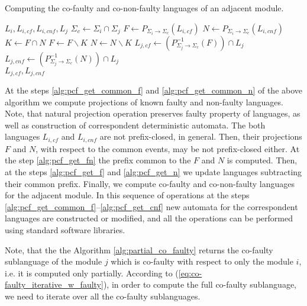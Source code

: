 \documentclass[a4paper, 10pt, conference]{ieeeconf}
\begin{document}
\begin{algorithm} Computing the co-faulty and co-non-faulty languages of an
adjacent module.
\label{alg:partial_co_faulty}
\begin{algorithmic}[1]
	\Require $L_i, L_{i,cf}, L_{i,cnf}, L_j$
	\State $\Sigma_c \leftarrow \Sigma_i \cap \Sigma_j$ 
		\label{alg:pcf_get_common}
	\State $F \leftarrow P_{\Sigma_i \rightarrow \Sigma_c}(L_{i,cf})$
		\label{alg:pcf_get_common_f}
	\State $N \leftarrow P_{\Sigma_i \rightarrow \Sigma_c}(L_{i,cnf})$
		\label{alg:pcf_get_common_n}
	\State $K \leftarrow F \cap N$
		\label{alg:pcf_get_fn}
	\State $F \leftarrow F\backslash K$
		\label{alg:pcf_get_f}
	\State $N \leftarrow N\backslash K$
		\label{alg:pcf_get_n}
	\State $L_{j,cf} \leftarrow 
		(P_{\Sigma_j \rightarrow \Sigma_c}^{-1}(F)) \cap L_j$
		\label{alg:pcf_get_cf}
	\State $L_{j,cnf} \leftarrow 
		(P_{\Sigma_j \rightarrow \Sigma_c}^{-1}(N)) \cap L_j$
		\label{alg:pcf_get_cnf}
	\\
	\Return $L_{j,cf}, L_{j,cnf}$
\end{algorithmic}
\end{algorithm}

At the steps \ref{alg:pcf_get_common_f} and \ref{alg:pcf_get_common_n} of the
above algorithm we compute projections of known faulty and non-faulty languages.
Note, that natural projection operation preserves faulty property of languages,
as well as construction of correspondent deterministic automata. The both
languages $L_{i,cf}$ and $L_{i,cnf}$ are not prefix-closed, in general. Then,
their projections $F$ and $N$, with respect to the common events, may be not
prefix-closed either. At the step \ref{alg:pcf_get_fn} the prefix common to the
$F$ and $N$ is computed. Then, at the steps \ref{alg:pcf_get_f} and
\ref{alg:pcf_get_n} we update languages subtracting their common prefix.
Finally, we compute co-faulty and co-non-faulty languages for the adjacent
module. In this sequence of operations at the steps
\ref{alg:pcf_get_common_f}--\ref{alg:pcf_get_cnf} new automata for the
correspondent languages are constructed or modified, and all the operations can
be performed using standard software libraries.

Note, that the the Algorithm \ref{alg:partial_co_faulty} returns the co-faulty
sublanguage of the module $j$ which is co-faulty with respect to only the module
$i$, i.e. it is computed only partially. According to
(\ref{eq:co-faulty_iterative_w_faulty}), in order to compute the full co-faulty
sublanguage, we need to iterate over all the co-faulty sublanguages.
\end{document}
